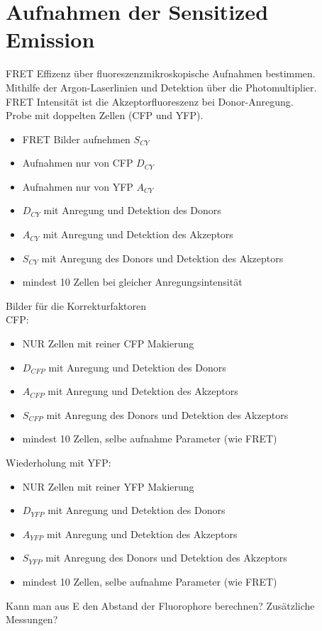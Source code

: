 \documentclass[a4paper, twoside]{article}
\begin{document}
\section{Aufnahmen der Sensitized Emission}
FRET Effizenz über fluoreszenzmikroskopische Aufnahmen bestimmen.\\ 
Mithilfe der Argon-Laserlinien und Detektion über die Photomultiplier.\\
FRET Intensität ist die Akzeptorfluoreszenz bei Donor-Anregung.\\
Probe mit doppelten Zellen (CFP und YFP).
\begin{itemize}
    \item FRET Bilder aufnehmen $S_{CY}$
    \item Aufnahmen nur von CFP $D_{CY}$
    \item Aufnahmen nur von YFP $A_{CY}$
    \item $D_{CY}$ mit Anregung und Detektion des Donors
    \item $A_{CY}$ mit Anregung und Detektion des Akzeptors
    \item $S_{CY}$ mit Anregung des Donors und Detektion des Akzeptors
    \item mindest 10 Zellen bei gleicher Anregungsintensität
\end{itemize}  
Bilder für die Korrekturfaktoren\\
CFP: 
\begin{itemize}
    \item NUR Zellen mit reiner CFP Makierung
    \item $D_{CFP}$ mit Anregung und Detektion des Donors
    \item $A_{CFP}$ mit Anregung und Detektion des Akzeptors
    \item $S_{CFP}$ mit Anregung des Donors und Detektion des Akzeptors
    \item mindest 10 Zellen, selbe aufnahme Parameter (wie FRET)
\end{itemize}
Wiederholung mit YFP:
\begin{itemize}
    \item NUR Zellen mit reiner YFP Makierung
    \item $D_{YFP}$ mit Anregung und Detektion des Donors
    \item $A_{YFP}$ mit Anregung und Detektion des Akzeptors
    \item $S_{YFP}$ mit Anregung des Donors und Detektion des Akzeptors
    \item mindest 10 Zellen, selbe aufnahme Parameter (wie FRET)
\end{itemize}
Kann man aus E den Abstand der Fluorophore berechnen? Zusätzliche Messungen?
\end{document}
